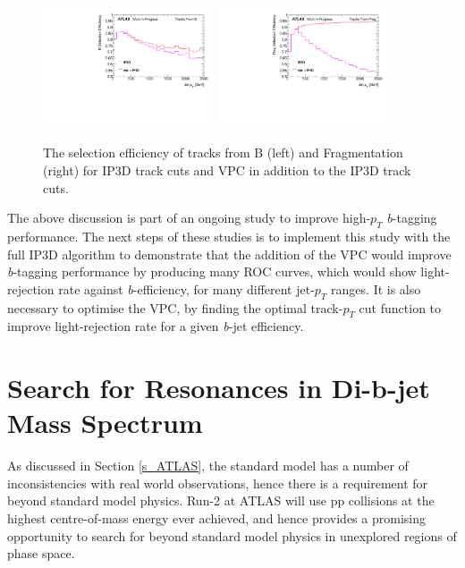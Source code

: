 \documentclass[12pt, onecolumn,notitlepage]{article}
\begin{document}
\begin{figure}[!bht]
	 \includegraphics[width=0.45\textwidth]{plots/vpc/effFromB.pdf}
	 \includegraphics[width=0.45\textwidth]{plots/vpc/effFromFrag.pdf}
	 \caption{The selection efficiency of tracks from B (left) and Fragmentation (right) for IP3D track cuts and VPC in addition to the IP3D track cuts.}
         \label{eff}
\end{figure}


The above discussion is part of an ongoing study to improve high-$p_T$ \textit{b}-tagging performance. 
The next steps of these studies is to implement this study with the full IP3D algorithm to demonstrate that 
the addition of the VPC would improve \textit{b}-tagging performance by producing many ROC curves, 
which would show light-rejection rate against \textit{b}-efficiency, for many different jet-$p_T$ ranges.
It is also necessary to optimise the VPC, by finding the optimal track-$p_T$ cut function to improve light-rejection 
rate for a given \textit{b}-jet efficiency.

\section{Search for Resonances in Di-b-jet Mass Spectrum} \label{s_dibjet}

As discussed in Section \ref{s_ATLAS}, the standard model has a number of inconsistencies with real world observations,
hence there is a requirement for beyond standard model physics.
Run-2 at ATLAS will use pp collisions at the highest centre-of-mass energy ever achieved, 
and hence provides a promising opportunity to search for beyond standard model physics in unexplored
regions of phase space. \\
\end{document}
